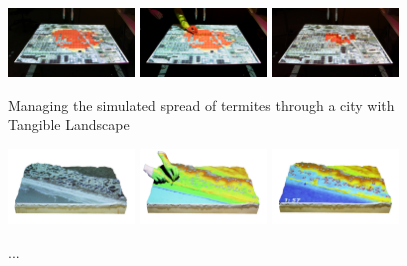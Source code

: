 \documentclass[prodmode,acmtochi]{acmsmall} %
\begin{document}

\begin{figure}[ht!]
\begin{center}
		\includegraphics[width=0.3\textwidth]{images/termite_game_1.jpg}
		\includegraphics[width=0.3\textwidth]{images/termite_game_2.jpg}
		\includegraphics[width=0.3\textwidth]{images/termite_game_3.jpg}
	\caption{Managing the simulated spread of termites through a city with Tangible Landscape}
	\label{fig:termite_game}
\end{center}
\end{figure}

\begin{figure}[ht!]
\begin{center}
		\includegraphics[width=0.3\textwidth]{images/tl_coastal_1s.png}
		\includegraphics[width=0.3\textwidth]{images/tl_coastal_3s.png}
		\includegraphics[width=0.3\textwidth]{images/tl_coastal_4s.png}
	\caption{...}
	\label{fig:coastal_game}
\end{center}
\end{figure}
\end{document}
